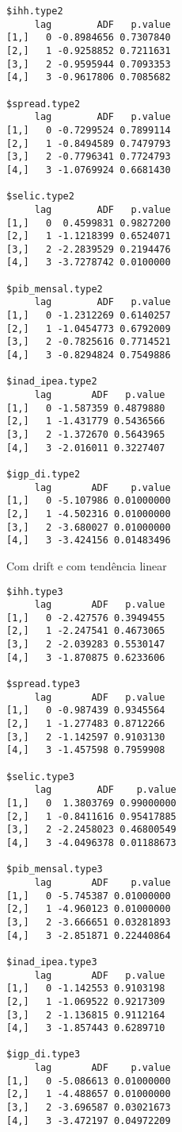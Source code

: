 \documentclass[]{article}
\begin{document}
\begin{verbatim}
$ihh.type2
     lag        ADF   p.value
[1,]   0 -0.8984656 0.7307840
[2,]   1 -0.9258852 0.7211631
[3,]   2 -0.9595944 0.7093353
[4,]   3 -0.9617806 0.7085682

$spread.type2
     lag        ADF   p.value
[1,]   0 -0.7299524 0.7899114
[2,]   1 -0.8494589 0.7479793
[3,]   2 -0.7796341 0.7724793
[4,]   3 -1.0769924 0.6681430

$selic.type2
     lag        ADF   p.value
[1,]   0  0.4599831 0.9827200
[2,]   1 -1.1218399 0.6524071
[3,]   2 -2.2839529 0.2194476
[4,]   3 -3.7278742 0.0100000

$pib_mensal.type2
     lag        ADF   p.value
[1,]   0 -1.2312269 0.6140257
[2,]   1 -1.0454773 0.6792009
[3,]   2 -0.7825616 0.7714521
[4,]   3 -0.8294824 0.7549886

$inad_ipea.type2
     lag       ADF   p.value
[1,]   0 -1.587359 0.4879880
[2,]   1 -1.431779 0.5436566
[3,]   2 -1.372670 0.5643965
[4,]   3 -2.016011 0.3227407

$igp_di.type2
     lag       ADF    p.value
[1,]   0 -5.107986 0.01000000
[2,]   1 -4.502316 0.01000000
[3,]   2 -3.680027 0.01000000
[4,]   3 -3.424156 0.01483496
\end{verbatim}

\newpage

\large{Com drift e com tendência linear}

\begin{verbatim}
$ihh.type3
     lag       ADF   p.value
[1,]   0 -2.427576 0.3949455
[2,]   1 -2.247541 0.4673065
[3,]   2 -2.039283 0.5530147
[4,]   3 -1.870875 0.6233606

$spread.type3
     lag       ADF   p.value
[1,]   0 -0.987439 0.9345564
[2,]   1 -1.277483 0.8712266
[3,]   2 -1.142597 0.9103130
[4,]   3 -1.457598 0.7959908

$selic.type3
     lag        ADF    p.value
[1,]   0  1.3803769 0.99000000
[2,]   1 -0.8411616 0.95417885
[3,]   2 -2.2458023 0.46800549
[4,]   3 -4.0496378 0.01188673

$pib_mensal.type3
     lag       ADF    p.value
[1,]   0 -5.745387 0.01000000
[2,]   1 -4.960123 0.01000000
[3,]   2 -3.666651 0.03281893
[4,]   3 -2.851871 0.22440864

$inad_ipea.type3
     lag       ADF   p.value
[1,]   0 -1.142553 0.9103198
[2,]   1 -1.069522 0.9217309
[3,]   2 -1.136815 0.9112164
[4,]   3 -1.857443 0.6289710

$igp_di.type3
     lag       ADF    p.value
[1,]   0 -5.086613 0.01000000
[2,]   1 -4.488657 0.01000000
[3,]   2 -3.696587 0.03021673
[4,]   3 -3.472197 0.04972209
\end{verbatim}
\end{document}
